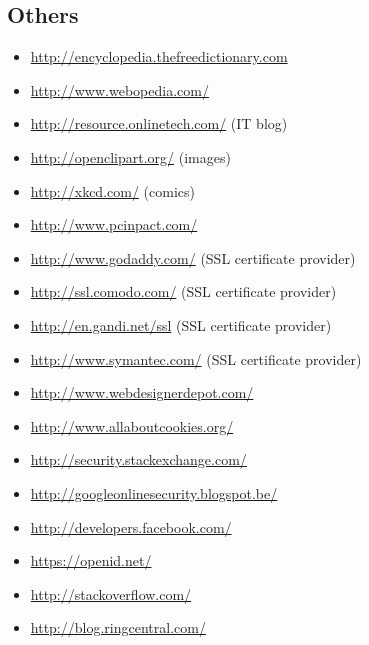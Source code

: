 \subsection{Others}
\begin{itemize}
\item \url{http://encyclopedia.thefreedictionary.com}
\item \url{http://www.webopedia.com/}

\item \url{http://resource.onlinetech.com/} (IT blog)
\item \url{http://openclipart.org/} (images)
\item \url{http://xkcd.com/} (comics) 
\item \url{http://www.pcinpact.com/}

\item \url{http://www.godaddy.com/} (SSL certificate provider)
\item \url{http://ssl.comodo.com/} (SSL certificate provider)
\item \url{http://en.gandi.net/ssl} (SSL certificate provider)
\item \url{http://www.symantec.com/} (SSL certificate provider)

\item \url{http://www.webdesignerdepot.com/}
\item \url{http://www.allaboutcookies.org/}
\item \url{http://security.stackexchange.com/}
\item \url{http://googleonlinesecurity.blogspot.be/}
\item \url{http://developers.facebook.com/}
\item \url{https://openid.net/}
\item \url{http://stackoverflow.com/}
\item \url{http://blog.ringcentral.com/}

\end{itemize}
